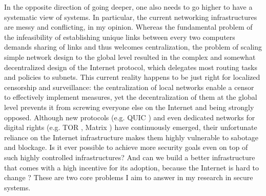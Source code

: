 \documentclass[10pt]{article}
\begin{document}
In the opposite direction of going deeper, one also needs to go higher to
have a systematic view of systems. In particular, the current networking
infrastructures are messy and conflicting, in my opinion. Whereas the
fundamental problem of the infeasibility of establishing unique links between
every two computers demands sharing of links and thus welcomes centralization,
the problem of scaling simple network design to the global level resulted in
the complex and somewhat decentralized design of the Internet protocol, which
delegates most routing tasks and policies to subnets. This current reality
happens to be just right for localized censorship and surveillance: the
centralization of local networks enable a censor to effectively implement
measures, yet the decentralization of them at the global level prevents it from
screwing everyone else on the Internet and being strongly opposed. Although new
protocols (e.g. QUIC \cite{quic}) and even dedicated networks for digital
rights (e.g. TOR \cite{onion.routing, tor}, Matrix \cite{matrix}) have
continuously emerged, their unfortunate reliance on the Internet
infrastructure makes them highly vulnerable to sabotage and blockage. Is it
ever possible to achieve more security goals even on top of such highly
controlled infrastructures? And can we build a better infrastructure that comes
with a high incentive for its adoption, because the Internet is hard to change
\cite{why.internet.just.works}? These are two core problems I aim to answer in
my research in secure systems.
\end{document}
